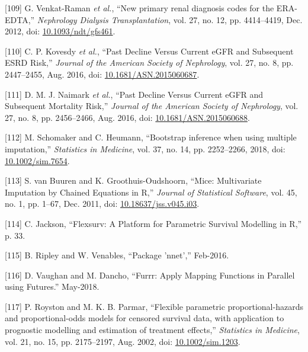 \documentclass[12pt,PhD,twoside,openright]{muthesis}
\newenvironment{cslreferences}%
  {}%
  {\par}
\begin{document}
\begin{cslreferences}
\leavevmode\hypertarget{ref-venkat-raman_new_2012}{}%
{[}109{]} G. Venkat-Raman \emph{et al.}, ``New primary renal diagnosis codes for the ERA-EDTA,'' \emph{Nephrology Dialysis Transplantation}, vol. 27, no. 12, pp. 4414--4419, Dec. 2012, doi: \href{https://doi.org/10.1093/ndt/gfs461}{10.1093/ndt/gfs461}.

\leavevmode\hypertarget{ref-kovesdy_past_2016}{}%
{[}110{]} C. P. Kovesdy \emph{et al.}, ``Past Decline Versus Current eGFR and Subsequent ESRD Risk,'' \emph{Journal of the American Society of Nephrology}, vol. 27, no. 8, pp. 2447--2455, Aug. 2016, doi: \href{https://doi.org/10.1681/ASN.2015060687}{10.1681/ASN.2015060687}.

\leavevmode\hypertarget{ref-naimark_past_2016}{}%
{[}111{]} D. M. J. Naimark \emph{et al.}, ``Past Decline Versus Current eGFR and Subsequent Mortality Risk,'' \emph{Journal of the American Society of Nephrology}, vol. 27, no. 8, pp. 2456--2466, Aug. 2016, doi: \href{https://doi.org/10.1681/ASN.2015060688}{10.1681/ASN.2015060688}.

\leavevmode\hypertarget{ref-schomaker_bootstrap_2018}{}%
{[}112{]} M. Schomaker and C. Heumann, ``Bootstrap inference when using multiple imputation,'' \emph{Statistics in Medicine}, vol. 37, no. 14, pp. 2252--2266, 2018, doi: \href{https://doi.org/10.1002/sim.7654}{10.1002/sim.7654}.

\leavevmode\hypertarget{ref-buuren_mice_2011-1}{}%
{[}113{]} S. van Buuren and K. Groothuis-Oudshoorn, ``Mice: Multivariate Imputation by Chained Equations in R,'' \emph{Journal of Statistical Software}, vol. 45, no. 1, pp. 1--67, Dec. 2011, doi: \href{https://doi.org/10.18637/jss.v045.i03}{10.18637/jss.v045.i03}.

\leavevmode\hypertarget{ref-jackson_flexsurv_nodate}{}%
{[}114{]} C. Jackson, ``Flexsurv: A Platform for Parametric Survival Modelling in R,'' p. 33.

\leavevmode\hypertarget{ref-ripley_package_2016}{}%
{[}115{]} B. Ripley and W. Venables, ``Package 'nnet','' Feb-2016.

\leavevmode\hypertarget{ref-vaughan_furrr_2018}{}%
{[}116{]} D. Vaughan and M. Dancho, ``Furrr: Apply Mapping Functions in Parallel using Futures.'' May-2018.

\leavevmode\hypertarget{ref-royston_flexible_2002}{}%
{[}117{]} P. Royston and M. K. B. Parmar, ``Flexible parametric proportional-hazards and proportional-odds models for censored survival data, with application to prognostic modelling and estimation of treatment effects,'' \emph{Statistics in Medicine}, vol. 21, no. 15, pp. 2175--2197, Aug. 2002, doi: \href{https://doi.org/10.1002/sim.1203}{10.1002/sim.1203}.


\end{cslreferences}
\end{document}
